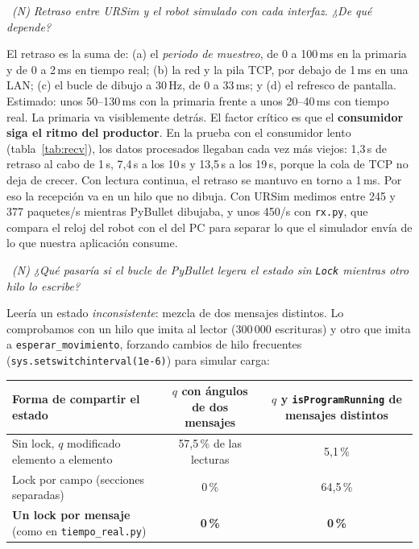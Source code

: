\documentclass[10pt,a4paper]{article}
\newcommand{\code}[1]{\texttt{\small #1}}
\newcommand{\preg}[2]{\par\smallskip\noindent{\color{azul}\bfseries P#1.}~{\itshape #2}\par\nopagebreak}
\begin{document}
\preg{7}{(N) Retraso entre URSim y el robot simulado con cada interfaz. ¿De qué depende?}
El retraso es la suma de: (a) el \emph{periodo de muestreo}, de 0 a 100\,ms en la primaria y de 0 a 2\,ms en tiempo real; (b) la red y la pila TCP, por debajo de 1\,ms en una LAN; (c) el bucle de dibujo a 30\,Hz, de 0 a 33\,ms; y (d) el refresco de pantalla. Estimado: unos 50--130\,ms con la primaria frente a unos 20--40\,ms con tiempo real. La primaria va visiblemente detrás. El factor crítico es que el \textbf{consumidor siga el ritmo del productor}. En la prueba con el consumidor lento (tabla~\ref{tab:recv}), los datos procesados llegaban cada vez más viejos: 1,3\,s de retraso al cabo de 1\,s, 7,4\,s a los 10\,s y 13,5\,s a los 19\,s, porque la cola de TCP no deja de crecer. Con lectura continua, el retraso se mantuvo en torno a 1\,ms. Por eso la recepción va en un hilo que no dibuja. Con URSim medimos entre 245 y 377 paquetes/s mientras PyBullet dibujaba, y unos 450/s con \code{rx.py}, que compara el reloj del robot con el del PC para separar lo que el simulador envía de lo que nuestra aplicación consume.

\preg{8}{(N) ¿Qué pasaría si el bucle de PyBullet leyera el estado sin \code{Lock} mientras otro hilo lo escribe?}
Leería un estado \emph{inconsistente}: mezcla de dos mensajes distintos. Lo comprobamos con un hilo que imita al lector (300\,000 escrituras) y otro que imita a \code{esperar\_movimiento}, forzando cambios de hilo frecuentes (\code{sys.setswitchinterval(1e-6)}) para simular carga:

\begin{center}\small
\begin{tabular}{@{}l c c@{}}
\toprule
Forma de compartir el estado & \shortstack{$q$ con ángulos\\de dos mensajes} & \shortstack{$q$ y \code{isProgramRunning}\\de mensajes distintos} \\ \midrule
Sin lock, $q$ modificado elemento a elemento & 57,5\,\% de las lecturas & 5,1\,\% \\
Lock por campo (secciones separadas) & 0\,\% & 64,5\,\% \\
\textbf{Un lock por mensaje} (como en \code{tiempo\_real.py}) & \textbf{0\,\%} & \textbf{0\,\%} \\ \bottomrule
\end{tabular}
\end{center}
\end{document}
